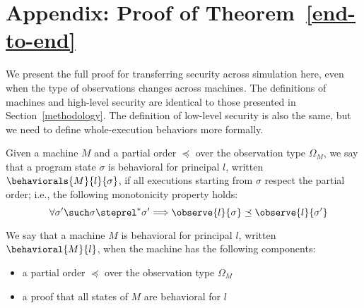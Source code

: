 \section{Appendix: Proof of Theorem~\ref{end-to-end}}
\label{appendix}

We present the full proof for transferring security across simulation here,
even when the type of observations changes across machines. The definitions
of machines and high-level security are identical to those presented in 
Section~\ref{methodology}. The definition of low-level security is also
the same, but we need to define whole-execution behaviors more formally.

\begin{definition}
Given a machine $M$ and a partial order $\preceq$ over the observation 
type $\Omega_M$, we say that a program state $\sigma$ is behavioral
for principal $l$, written $\behaviorals{M}{l}{\sigma}$,
if all executions starting from $\sigma$ respect 
the partial order; i.e., the following monotonicity property holds:
\[\quad \forall \sigma' \such \sigma \steprel^* \sigma' 
\Longrightarrow \observe{l}{\sigma} \preceq \observe{l}{\sigma'}\]
\end{definition}

\begin{definition}
We say that a machine $M$ is behavioral for principal $l$, written 
$\behavioral{M}{l}$, when the machine has the following components:
\begin{itemize}
\item a partial order $\preceq$ over the observation type $\Omega_M$
\item a proof that all states of $M$ are behavioral for $l$
\end{itemize}
\end{definition}

